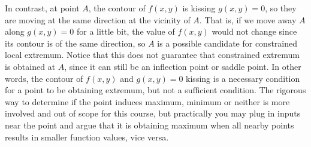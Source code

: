 In contrast, at point $A$, the contour of $f(x,y)$ is kissing $g(x,y) = 0$, so they are moving at the same direction at the vicinity of $A$.  That is, if we move away $A$ along $g(x,y)=0$ for a little bit, the value of $f(x,y)$ would not change since its contour is of the same direction, so $A$ is a possible candidate for constrained local extremum.  Notice that this does not guarantee that constrained extremum is obtained at $A$, since it can still be an inflection point or saddle point.  In other words, the contour of $f(x,y)$ and $g(x,y) = 0$ kissing is a necessary condition for a point to be obtaining extremum, but not a sufficient condition.  The rigorous way to determine if the point induces maximum, minimum or neither is more involved and out of scope for this course, but practically you may plug in inputs near the point and argue that it is obtaining maximum when all nearby points results in smaller function values, vice versa.

